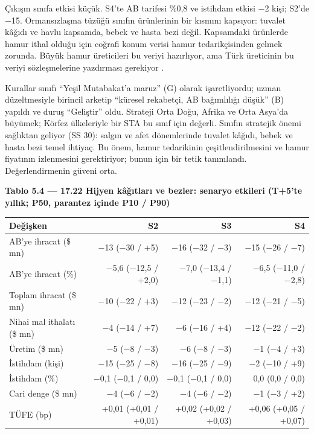 Çıkışın sınıfa etkisi küçük. S4'te AB tarifesi \%0,8 ve istihdam etkisi −2 kişi; S2'de −15. Ormansızlaşma tüzüğü sınıfın ürünlerinin bir kısmını kapsıyor: tuvalet kâğıdı ve havlu kapsamda, bebek ve hasta bezi değil. Kapsamdaki ürünlerde hamur ithal olduğu için coğrafi konum verisi hamur tedarikçisinden gelmek zorunda. Büyük hamur üreticileri bu veriyi hazırlıyor, ama Türk üreticinin bu veriyi sözleşmelerine yazdırması gerekiyor \etiketH{}.

Kurallar sınıfı ``Yeşil Mutabakat'a maruz'' (G) olarak işaretliyordu; uzman düzeltmesiyle birincil arketip ``küresel rekabetçi, AB bağımlılığı düşük'' (B) yapıldı ve duruş ``Geliştir'' oldu. Strateji Orta Doğu, Afrika ve Orta Asya'da büyümek; Körfez ülkeleriyle bir STA bu sınıf için değerli. Sınıfın stratejik önemi sağlıktan geliyor (SS 30): salgın ve afet dönemlerinde tuvalet kâğıdı, bebek ve hasta bezi temel ihtiyaç. Bu önem, hamur tedarikinin çeşitlendirilmesini ve hamur fiyatının izlenmesini gerektiriyor; bunun için bir tetik tanımlandı. Değerlendirmenin güveni orta.


\textbf{Tablo 5.4 --- 17.22 Hijyen kâğıtları ve bezler: senaryo etkileri (T+5'te yıllık; P50, parantez içinde P10 / P90)}

\nopagebreak[4]

\begingroup\gbtablo\small

\begin{longtable}[]{@{}lrrr@{}}
\toprule\noalign{}
\textbf{Değişken} & \textbf{S2} & \textbf{S3} & \textbf{S4} \\
\midrule\noalign{}
\endhead
\bottomrule\noalign{}
\endlastfoot
AB'ye ihracat (\$ mn) & −13 (−30 / +5) & −16 (−32 / −3) & −15 (−26 / −7) \\
AB'ye ihracat (\%) & −5,6 (−12,5 / +2,0) & −7,0 (−13,4 / −1,1) & −6,5 (−11,0 / −2,8) \\
Toplam ihracat (\$ mn) & −10 (−22 / +3) & −12 (−23 / −2) & −12 (−21 / −5) \\
Nihai mal ithalatı (\$ mn) & −4 (−14 / +7) & −6 (−16 / +4) & −12 (−22 / −2) \\
Üretim (\$ mn) & −5 (−8 / −3) & −6 (−8 / −3) & −1 (−4 / +3) \\
İstihdam (kişi) & −15 (−25 / −8) & −16 (−25 / −9) & −2 (−10 / +9) \\
İstihdam (\%) & −0,1 (−0,1 / 0,0) & −0,1 (−0,1 / 0,0) & 0,0 (0,0 / 0,0) \\
Cari denge (\$ mn) & −4 (−6 / −2) & −4 (−6 / −2) & −1 (−3 / +2) \\
TÜFE (bp) & +0,01 (+0,01 / +0,01) & +0,02 (+0,02 / +0,03) & +0,06 (+0,05 / +0,07) \\
\end{longtable}

